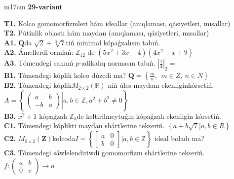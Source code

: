 \documentclass{article}
\begin{document}
\begin{tabular}{m{17cm}}
\textbf{29-variant}
\newline

\textbf{T1.} Kolco gomomorfizmleri hám ideallar (anıqlaması, qásiyetleri, mısallar) \\
\textbf{T2.} Pútinlik oblastı hám maydan (anıqlaması, qásiyetleri, mısallar) \\
\textbf{A1.} \(\mathbf{Q}\)da \(\sqrt{2} + \sqrt[3]{7}\)tiń minimal kópaǵzalısın tabıń. \\
\textbf{A2.} Ámellerdi orınlań: \(\mathbb{Z}_{12}\) de \(\left( 5x^{2} + 3x - 4 \right)\left( 4x^{2} - x + 9 \right)\) \\
\textbf{A3.} Tómendegi sannıń \(p\)-adikalıq normasın tabıń. \(|\frac{1}{4}|_{2} =\) \\
\textbf{B1.} Tómendegi kóplik kolco dúzedi ma? \(\mathbf{Q} = \left\{ \frac{m}{n},\ \ m \in Z,\ n \in N \right\}\) \\
\textbf{B2.} Tómendegi kóplik\(M_{2 \times 2}\left( \mathbb{R} \right)\) niń úles maydanı ekenliginkórsetiń. \(A = \left\{ \left. \ \begin{pmatrix}
a & b \\
 - b & a
\end{pmatrix} \right|a,b\mathbb{\in Z},a^{2} + b^{2} \neq 0 \right\}\) \\
\textbf{B3.} \(x^{2} + 1\) kópaǵzalı \(\mathbb{Z}_{3}\)de keltirilmeytuǵın kópaǵzalı ekenligin kórsetiń. \\
\textbf{C1.} Tómendegi kóplikti maydan shártlerine tekseriń. \(\left\{ a + b\sqrt{7}|a,b \in R \right\}\) \\
\textbf{C2.} \(M_{2 \times 2}\left( \mathbf{Z} \right)\)kolcoda\(I = \left\{ \begin{bmatrix}
a & 0 \\
b & 0
\end{bmatrix}|a,b\mathbb{\in Z} \right\}\) ideal boladı ma? \\
\textbf{C3.} Tómendegi sáwlelendiriwdi gomomorfizm shártlerine tekseriń. \(f:\begin{pmatrix}
a & b \\
0 & c
\end{pmatrix} \rightarrow a\) \\

\end{tabular}
\vspace{1cm}
\end{document}
